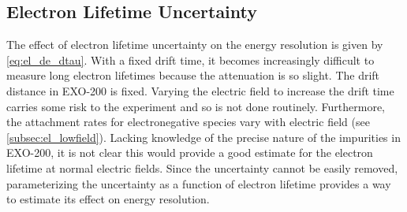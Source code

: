 \documentclass[herrin-thesis.tex]{subfiles}
\begin{document}
\subsection{Electron Lifetime Uncertainty}
\label{subsec:el_dtau}
The effect of electron lifetime uncertainty on the energy resolution is given by \cref{eq:el_de_dtau}. With a fixed drift time, it becomes increasingly difficult to measure long electron lifetimes because the attenuation is so slight. The drift distance in EXO-200 is fixed. Varying the electric field to increase the drift time carries some risk to the experiment and so is not done routinely. Furthermore, the attachment rates for electronegative species vary with electric field (see \cref{subsec:el_lowfield}). Lacking knowledge of the precise nature of the impurities in EXO-200, it is not clear this would provide a good estimate for the electron lifetime at normal electric fields. Since the uncertainty cannot be easily removed, parameterizing the uncertainty as a function of electron lifetime provides a way to estimate its effect on energy resolution.
\end{document}
